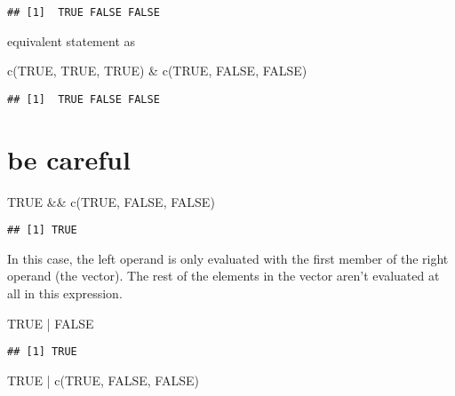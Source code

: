 \documentclass[
]{book}
\newenvironment{Shaded}{\begin{snugshade}}{\end{snugshade}}
\newcommand{\ConstantTok}[1]{\textcolor[rgb]{0.00,0.00,0.00}{#1}}
\newcommand{\FunctionTok}[1]{\textcolor[rgb]{0.00,0.00,0.00}{#1}}
\newcommand{\NormalTok}[1]{#1}
\newcommand{\SpecialCharTok}[1]{\textcolor[rgb]{0.00,0.00,0.00}{#1}}
\begin{document}
\begin{verbatim}
## [1]  TRUE FALSE FALSE
\end{verbatim}

equivalent statement as

\begin{Shaded}
\begin{Highlighting}[]
\FunctionTok{c}\NormalTok{(}\ConstantTok{TRUE}\NormalTok{, }\ConstantTok{TRUE}\NormalTok{, }\ConstantTok{TRUE}\NormalTok{) }\SpecialCharTok{\&} \FunctionTok{c}\NormalTok{(}\ConstantTok{TRUE}\NormalTok{, }\ConstantTok{FALSE}\NormalTok{, }\ConstantTok{FALSE}\NormalTok{)}
\end{Highlighting}
\end{Shaded}

\begin{verbatim}
## [1]  TRUE FALSE FALSE
\end{verbatim}

\hypertarget{be-careful}{%
\chapter{be careful}\label{be-careful}}

\begin{Shaded}
\begin{Highlighting}[]
\ConstantTok{TRUE} \SpecialCharTok{\&\&} \FunctionTok{c}\NormalTok{(}\ConstantTok{TRUE}\NormalTok{, }\ConstantTok{FALSE}\NormalTok{, }\ConstantTok{FALSE}\NormalTok{)}
\end{Highlighting}
\end{Shaded}

\begin{verbatim}
## [1] TRUE
\end{verbatim}

In this case, the left operand is only evaluated with the first member
of the right operand (the vector). The rest of the elements in the
vector aren't evaluated at all in this expression.

\begin{Shaded}
\begin{Highlighting}[]
\ConstantTok{TRUE} \SpecialCharTok{|} \ConstantTok{FALSE}
\end{Highlighting}
\end{Shaded}

\begin{verbatim}
## [1] TRUE
\end{verbatim}

\begin{Shaded}
\begin{Highlighting}[]
\ConstantTok{TRUE} \SpecialCharTok{|} \FunctionTok{c}\NormalTok{(}\ConstantTok{TRUE}\NormalTok{, }\ConstantTok{FALSE}\NormalTok{, }\ConstantTok{FALSE}\NormalTok{)}
\end{Highlighting}
\end{Shaded}
\end{document}
